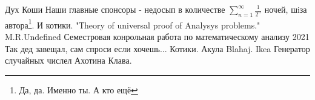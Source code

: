 \begin{thebibliography}{XXXX}
	 Дух Коши
	  Наши главные спонсоры - недосып в количестве $ \sum_{n=1}^{\infty} {\frac{1}{2^n}}$ ночей, шiза автора\footnote{Да, да. Именно ты. А кто ещё}. И котики.
	 "Тheory of universal proof of Analysys problems." M.R.Undefined
	 Семестровая конрольная работа по математическому анализу 2021
	 Так дед завещал, сам спроси если хочешь...
	 Котики. 
	 Акула Blahaj. Ikea
	 Генератор случайных числел
	 Ахотина Клава.
\end{thebibliography}
